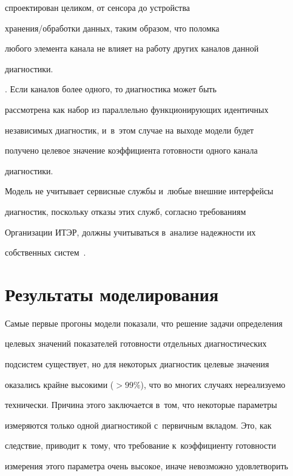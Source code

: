 \begin{itemize}
{спроектирован целиком, от сенсора до устройства  


хра\-не\-ния\!/\!об\-ра\-бот\-ки данных, таким образом, что поломка 


любого элемента канала не влияет на работу других каналов данной 


диагностики.}. Если каналов более одного, то диагностика может быть 


рассмотрена как набор из параллельно функционирующих идентичных 


независимых диагностик, и~в~этом случае на выходе модели будет 


получено целевое значение коэффициента го\-тов\-ности одного канала 


диагностики.


\end{itemize}





Модель не учитывает сервисные службы и~любые внешние интерфейсы 


диагностик, поскольку отказы этих служб, согласно требованиям 


Организации ИТЭР, должны учитываться в~анализе на\-деж\-ности их 


собственных сис\-тем~\cite{9-kn}. 





\section{Результаты моделирования }





Самые первые прогоны модели показали, что решение задачи определения 


целевых значений показателей готовности отдельных диагностических 


подсистем существует, но для некоторых диагностик целевые значения 


оказались крайне высокими ($> 99\%$), что во многих случаях нереализуемо 


технически. Причина этого заключается в~том, что некоторые параметры 


измеряются только одной диагностикой с~первичным вкладом. Это, как 


следствие, приводит к~тому, что требование к~коэффициенту готовности 


измерения этого параметра очень высокое, иначе невозможно удовлетворить 


